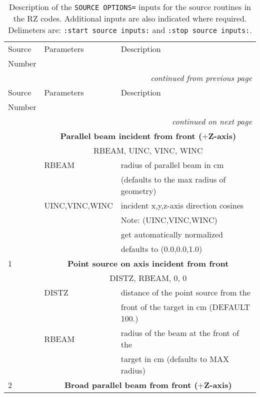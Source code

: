 \begin{longtable}{lll}
\caption[Description of source options for the RZ codes]
{Description of the {\tt SOURCE OPTIONS=} inputs for the source 
routines in the RZ codes.  Additional inputs are also indicated
where required.  Delimeters are: {\tt :start source inputs:} 
and {\tt :stop source inputs:}.}\\
\hline\hline
Source & Parameters & Description \\
Number &&\\
\hline
\endfirsthead
\hline
\multicolumn{3}{r}{\small\slshape continued from previous page} \\
\hline \hline
Source & Parameters      & Description \\
Number &&\\
\hline
\endhead
\hline
\multicolumn{3}{r}{\small\slshape continued on next page} \\ \hline
\endfoot
\hline \hline
\endlastfoot
0 & \multicolumn{2}{c}{\bf Parallel beam incident from front ($+$Z-axis)}\\
  & \multicolumn{2}{c}{      RBEAM, UINC, VINC, WINC}\\
  & RBEAM   & radius of parallel beam in cm       \\
  &         & (defaults to the max radius of geometry)\\
  & UINC,VINC,WINC    & incident x,y,z-axis direction cosines \\
  &                & Note: (UINC,VINC,WINC) \\
  &                & get automatically normalized \\
  &                 &  defaults to (0.0,0.0,1.0) \\
\hline
1 & \multicolumn{2}{c}{\bf Point source on axis incident from front}\\
  & \multicolumn{2}{c}{      DISTZ, RBEAM, 0, 0}\\
  & DISTZ   & distance of the point source from the\\
  &                & front of the target in cm (DEFAULT 100.)\\
  & RBEAM   & radius of the beam at the front of the\\
  &                & target in cm (defaults to MAX radius) \\
\hline 
2 & \multicolumn{2}{c}{\bf Broad parallel beam from front ($+$Z-axis)} \\

\end{longtable}
